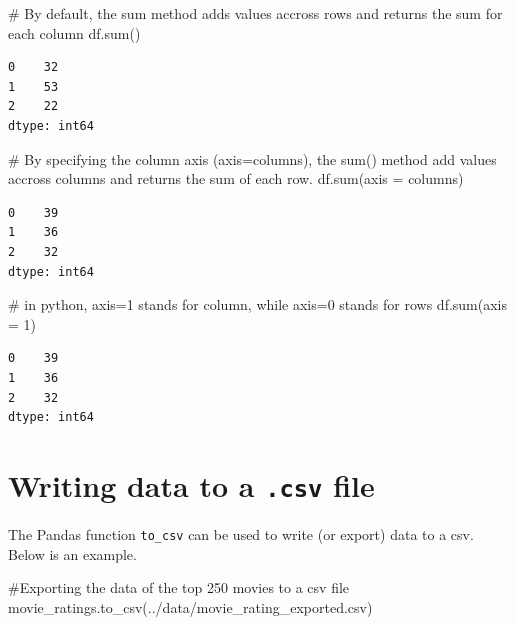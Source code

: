 \documentclass[
  letterpaper,
  DIV=11,
  numbers=noendperiod]{scrreprt}
\newenvironment{Shaded}{\begin{snugshade}}{\end{snugshade}}
\newcommand{\BuiltInTok}[1]{\textcolor[rgb]{0.00,0.23,0.31}{#1}}
\newcommand{\CommentTok}[1]{\textcolor[rgb]{0.37,0.37,0.37}{#1}}
\newcommand{\DecValTok}[1]{\textcolor[rgb]{0.68,0.00,0.00}{#1}}
\newcommand{\NormalTok}[1]{\textcolor[rgb]{0.00,0.23,0.31}{#1}}
\newcommand{\OperatorTok}[1]{\textcolor[rgb]{0.37,0.37,0.37}{#1}}
\newcommand{\StringTok}[1]{\textcolor[rgb]{0.13,0.47,0.30}{#1}}
\begin{document}
\begin{Shaded}
\begin{Highlighting}[]
\CommentTok{\# By default, the sum method adds values accross rows and returns the sum for each column}
\NormalTok{df.}\BuiltInTok{sum}\NormalTok{()}
\end{Highlighting}
\end{Shaded}

\begin{verbatim}
0    32
1    53
2    22
dtype: int64
\end{verbatim}

\begin{Shaded}
\begin{Highlighting}[]
\CommentTok{\# By specifying the column axis (axis=\textquotesingle{}columns\textquotesingle{}), the sum() method add values accross columns and returns the sum of each row.}
\NormalTok{df.}\BuiltInTok{sum}\NormalTok{(axis }\OperatorTok{=} \StringTok{\textquotesingle{}columns\textquotesingle{}}\NormalTok{)}
\end{Highlighting}
\end{Shaded}

\begin{verbatim}
0    39
1    36
2    32
dtype: int64
\end{verbatim}

\begin{Shaded}
\begin{Highlighting}[]
\CommentTok{\# in python, axis=1 stands for column, while axis=0 stands for rows}
\NormalTok{df.}\BuiltInTok{sum}\NormalTok{(axis }\OperatorTok{=} \DecValTok{1}\NormalTok{)}
\end{Highlighting}
\end{Shaded}

\begin{verbatim}
0    39
1    36
2    32
dtype: int64
\end{verbatim}

\hypertarget{writing-data-to-a-.csv-file}{%
\section{\texorpdfstring{Writing data to a \texttt{.csv}
file}{Writing data to a .csv file}}\label{writing-data-to-a-.csv-file}}

The Pandas function \texttt{to\_csv} can be used to write (or export)
data to a csv. Below is an example.

\begin{Shaded}
\begin{Highlighting}[]
\CommentTok{\#Exporting the data of the top 250 movies to a csv file}
\NormalTok{movie\_ratings.to\_csv(}\StringTok{\textquotesingle{}../data/movie\_rating\_exported.csv\textquotesingle{}}\NormalTok{)}
\end{Highlighting}
\end{Shaded}
\end{document}
